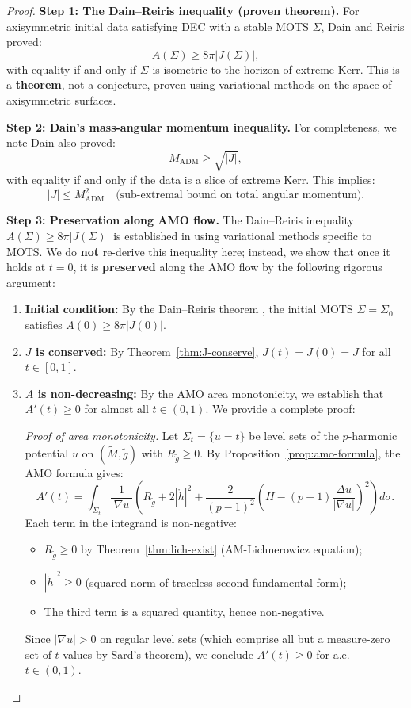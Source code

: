 \documentclass[12pt]{article}
\theoremstyle{plain}
\theoremstyle{definition}
\theoremstyle{remark}
\newcommand{\ADM}{\mathrm{ADM}}
\newcommand{\tM}{\tilde{M}}
\newcommand{\tg}{\tilde{g}}
\begin{document}
\begin{proof}
\textbf{Step 1: The Dain--Reiris inequality (proven theorem).}
For axisymmetric initial data satisfying DEC with a stable MOTS $\Sigma$, Dain and Reiris \cite{dain2011} proved:
\[
A(\Sigma) \geq 8\pi|J(\Sigma)|,
\]
with equality if and only if $\Sigma$ is isometric to the horizon of extreme Kerr. This is a \textbf{theorem}, not a conjecture, proven using variational methods on the space of axisymmetric surfaces.

\textbf{Step 2: Dain's mass-angular momentum inequality.}
For completeness, we note Dain \cite{dain2008} also proved:
\[
M_{\ADM} \geq \sqrt{|J|},
\]
with equality if and only if the data is a slice of extreme Kerr. This implies:
\[
|J| \leq M_{\ADM}^2 \quad \text{(sub-extremal bound on total angular momentum)}.
\]

\textbf{Step 3: Preservation along AMO flow.}
The Dain--Reiris inequality $A(\Sigma) \geq 8\pi|J(\Sigma)|$ is established in \cite{dain2011} using variational methods specific to MOTS. We do \textbf{not} re-derive this inequality here; instead, we show that once it holds at $t = 0$, it is \textbf{preserved} along the AMO flow by the following rigorous argument:

\begin{enumerate}
    \item[(i)] \textbf{Initial condition:} By the Dain--Reiris theorem \cite{dain2011}, the initial MOTS $\Sigma = \Sigma_0$ satisfies $A(0) \geq 8\pi|J(0)|$.
    
    \item[(ii)] \textbf{$J$ is conserved:} By Theorem~\ref{thm:J-conserve}, $J(t) = J(0) = J$ for all $t \in [0, 1]$.
    
    \item[(iii)] \textbf{$A$ is non-decreasing:} By the AMO area monotonicity, we establish that $A'(t) \geq 0$ for almost all $t \in (0,1)$. We provide a complete proof:
    
    \textit{Proof of area monotonicity.} Let $\Sigma_t = \{u = t\}$ be level sets of the $p$-harmonic potential $u$ on $(\tM, \tg)$ with $R_{\tg} \geq 0$. By Proposition~\ref{prop:amo-formula}, the AMO formula gives:
    \begin{equation}\label{eq:amo-formula-subext}
    A'(t) = \int_{\Sigma_t} \frac{1}{|\nabla u|}\left(R_{\tg} + 2|\mathring{h}|^2 + \frac{2}{(p-1)^2}\left(H - (p-1)\frac{\Delta u}{|\nabla u|}\right)^2\right) d\sigma.
    \end{equation}
    Each term in the integrand is non-negative:
    \begin{itemize}
        \item $R_{\tg} \geq 0$ by Theorem~\ref{thm:lich-exist} (AM-Lichnerowicz equation);
        \item $|\mathring{h}|^2 \geq 0$ (squared norm of traceless second fundamental form);
        \item The third term is a squared quantity, hence non-negative.
    \end{itemize}
    Since $|\nabla u| > 0$ on regular level sets (which comprise all but a measure-zero set of $t$ values by Sard's theorem), we conclude $A'(t) \geq 0$ for a.e.\ $t \in (0,1)$.
    

\end{enumerate}
\end{proof}
\end{document}
